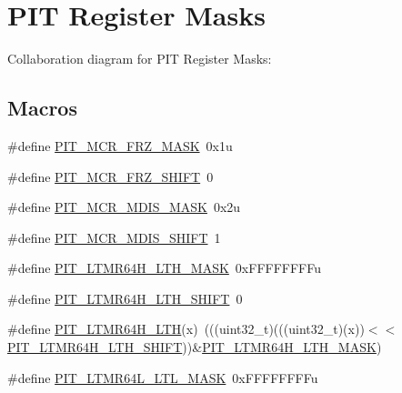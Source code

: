 \hypertarget{group___p_i_t___register___masks}{}\section{P\+IT Register Masks}
\label{group___p_i_t___register___masks}
Collaboration diagram for P\+IT Register Masks\+:
\subsection*{Macros}
\begin{DoxyCompactItemize}
\item 
\#define \hyperlink{group___p_i_t___register___masks_ga8149a0bb21843632dd4528b540480ba7}{P\+I\+T\+\_\+\+M\+C\+R\+\_\+\+F\+R\+Z\+\_\+\+M\+A\+SK}~0x1u
\item 
\#define \hyperlink{group___p_i_t___register___masks_ga500ccd29eaebc20aa853e7bbb23e3c0c}{P\+I\+T\+\_\+\+M\+C\+R\+\_\+\+F\+R\+Z\+\_\+\+S\+H\+I\+FT}~0
\item 
\#define \hyperlink{group___p_i_t___register___masks_ga024258b2c23ff75f3e161e56adbbe733}{P\+I\+T\+\_\+\+M\+C\+R\+\_\+\+M\+D\+I\+S\+\_\+\+M\+A\+SK}~0x2u
\item 
\#define \hyperlink{group___p_i_t___register___masks_ga7ddcd16550ff71e4ee5ac48022ae6fb6}{P\+I\+T\+\_\+\+M\+C\+R\+\_\+\+M\+D\+I\+S\+\_\+\+S\+H\+I\+FT}~1
\item 
\#define \hyperlink{group___p_i_t___register___masks_ga2f52ce484f53348d406fae4b3cac7fdf}{P\+I\+T\+\_\+\+L\+T\+M\+R64\+H\+\_\+\+L\+T\+H\+\_\+\+M\+A\+SK}~0x\+F\+F\+F\+F\+F\+F\+F\+Fu
\item 
\#define \hyperlink{group___p_i_t___register___masks_gaf355862db7eafd261031477364a6ef8d}{P\+I\+T\+\_\+\+L\+T\+M\+R64\+H\+\_\+\+L\+T\+H\+\_\+\+S\+H\+I\+FT}~0
\item 
\#define \hyperlink{group___p_i_t___register___masks_gad3b13100c85d855043c5f19494f33c2d}{P\+I\+T\+\_\+\+L\+T\+M\+R64\+H\+\_\+\+L\+TH}(x)~(((uint32\+\_\+t)(((uint32\+\_\+t)(x))$<$$<$\hyperlink{group___p_i_t___register___masks_gaf355862db7eafd261031477364a6ef8d}{P\+I\+T\+\_\+\+L\+T\+M\+R64\+H\+\_\+\+L\+T\+H\+\_\+\+S\+H\+I\+FT}))\&\hyperlink{group___p_i_t___register___masks_ga2f52ce484f53348d406fae4b3cac7fdf}{P\+I\+T\+\_\+\+L\+T\+M\+R64\+H\+\_\+\+L\+T\+H\+\_\+\+M\+A\+SK})
\item 
\#define \hyperlink{group___p_i_t___register___masks_gab7337206a85c605ed0ea16b77df99e1a}{P\+I\+T\+\_\+\+L\+T\+M\+R64\+L\+\_\+\+L\+T\+L\+\_\+\+M\+A\+SK}~0x\+F\+F\+F\+F\+F\+F\+F\+Fu
$$
\end{DoxyCompactItemize}
